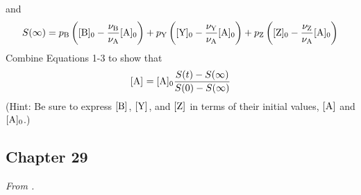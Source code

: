 \documentclass[../psets.tex]{subfiles}
\begin{document}
\begin{enumerate}[label={\textbf{28-\arabic*.}},leftmargin=3.5em]
    and
    \begin{equation}
        S(\infty) = p_{\ce{B}}\left( \cnc[0]{B}-\frac{\nu_{\ce{B}}}{\nu_{\ce{A}}}\cnc[0]{A} \right)+p_{\ce{Y}}\left( \cnc[0]{Y}-\frac{\nu_{\ce{Y}}}{\nu_{\ce{A}}}\cnc[0]{A} \right)+p_{\ce{Z}}\left( \cnc[0]{Z}-\frac{\nu_{\ce{Z}}}{\nu_{\ce{A}}}\cnc[0]{A} \right)
    \end{equation}
    Combine Equations 1-3 to show that
    \begin{equation*}
        \cnc{A} = \cnc[0]{A}\frac{S(t)-S(\infty)}{S(0)-S(\infty)}
    \end{equation*}
    (Hint: Be sure to express $\cnc{B}$, $\cnc{Y}$, and $\cnc{Z}$ in terms of their initial values, $\cnc{A}$ and $\cnc[0]{A}$.)
\end{enumerate}


\subsection*{Chapter 29}
\emph{From \textcite{bib:McQuarrieSimon}.}
\end{document}
